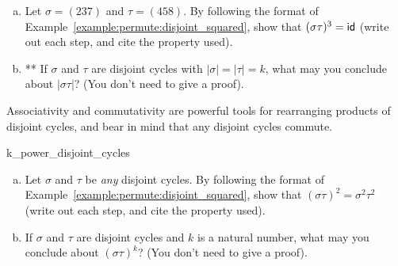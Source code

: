\begin{exercise}{}
\begin{enumerate}[(a)]
\item
Let $\sigma = (237)$ and $\tau = (458)$. By following the format of Example~\ref{example:permute:disjoint_squared}, show that $(\sigma \tau)^3 = {\sf{i}d} $ (write out each step, and cite the property used).
\item
** If $\sigma$ and $\tau$ are disjoint cycles with $|\sigma| = |\tau| = k$, what may you conclude about $| \sigma \tau |$? (You don't need to give a proof).
\end{enumerate}
\end{exercise}

\noindent
Associativity and commutativity are powerful tools for rearranging products of disjoint cycles, and bear in mind that any disjoint cycles commute.

\begin{exercise}{k_power_disjoint_cycles}
\begin{enumerate}[(a)]
\item
Let $\sigma$ and $\tau$ be \emph{any} disjoint cycles. By following the format of Example~\ref{example:permute:disjoint_squared}, show that $(\sigma \tau)^2 = \sigma^2 \tau^2$ (write out each step, and cite the property used).
\item
If $\sigma$ and $\tau$ are disjoint cycles and $k$ is a natural number, what may you conclude about $(\sigma \tau)^k$? (You don't need to give a proof).
\end{enumerate}
\end{exercise}



